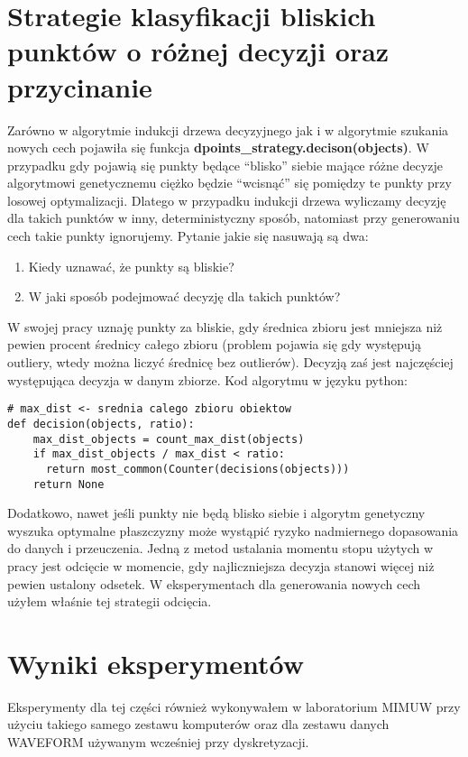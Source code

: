 \documentclass[magisterska]{pracamgr}
\theoremstyle{plain}
\theoremstyle{definition}
\theoremstyle{remark}
\begin{document}
\section{Strategie klasyfikacji bliskich punktów o różnej decyzji oraz przycinanie}\label{sec:strategy}
Zarówno w algorytmie indukcji drzewa decyzyjnego jak i w algorytmie szukania 
nowych cech pojawiła się funkcja \textbf{dpoints\_strategy.decison(objects)}. W przypadku
gdy pojawią się punkty będące ``blisko'' siebie mające różne decyzje algorytmowi genetycznemu ciężko
będzie ``wcisnąć'' się pomiędzy te punkty przy losowej optymalizacji. Dlatego w przypadku indukcji drzewa 
wyliczamy decyzję dla takich punktów w inny, deterministyczny sposób, natomiast przy generowaniu cech
takie punkty ignorujemy. Pytanie jakie się nasuwają są dwa:
\begin{enumerate}
 \item Kiedy uznawać, że punkty są bliskie?
 \item W jaki sposób podejmować decyzję dla takich punktów?
\end{enumerate}
W swojej pracy uznaję punkty za bliskie, gdy średnica zbioru jest mniejsza niż pewien procent 
średnicy całego zbioru (problem pojawia się gdy występują outliery, wtedy można liczyć średnicę
bez outlierów). Decyzją zaś jest najczęściej występująca decyzja w danym zbiorze. Kod algorytmu w języku python:
\begin{lstlisting}
# max_dist <- srednia calego zbioru obiektow
def decision(objects, ratio):
	max_dist_objects = count_max_dist(objects)
	if max_dist_objects / max_dist < ratio:
	  return most_common(Counter(decisions(objects)))
	return None
\end{lstlisting}
Dodatkowo, nawet jeśli punkty nie będą blisko siebie i algorytm genetyczny wyszuka optymalne płaszczyzny może
wystąpić ryzyko nadmiernego dopasowania do danych i przeuczenia. Jedną z metod ustalania momentu stopu użytych w pracy 
jest odcięcie w momencie, gdy najliczniejsza decyzja stanowi więcej niż pewien ustalony odsetek. 
W eksperymentach dla generowania nowych cech użyłem właśnie tej strategii odcięcia.

\section{Wyniki eksperymentów}
Eksperymenty dla tej części również wykonywałem w laboratorium MIMUW przy użyciu takiego samego zestawu komputerów
oraz dla zestawu danych WAVEFORM używanym wcześniej przy dyskretyzacji.
\end{document}
